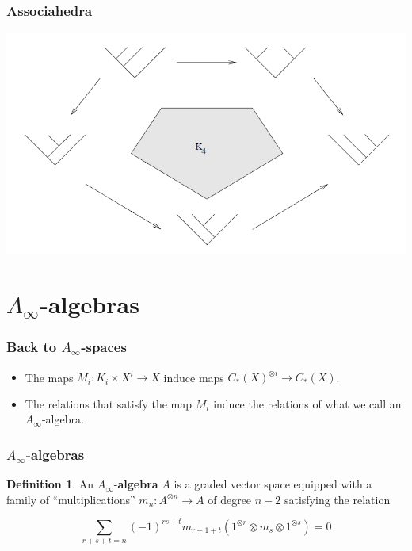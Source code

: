 \documentclass{beamer}
\theoremstyle{definition}
\newtheorem{defi}{Definition}
\begin{document}
\begin{frame}
\frametitle{Associahedra}
\includegraphics[scale=0.5]{Imagenes/assoc}
\end{frame}


\section{$A_\infty$-algebras}
\begin{frame}
\frametitle{Back to $A_\infty$-spaces}
\begin{itemize}
\item<1-> The maps $M_i:K_i\times X^i\to X$ induce maps $C_*(X)^{\otimes i}\to C_*(X)$. %

\item<2-> The relations that satisfy the map $M_i$ induce the relations of what we call an $A_\infty$-algebra.
\end{itemize}
\end{frame}
\begin{frame}
\frametitle{$A_\infty$-algebras}
\begin{defi}
An $A_\infty$-\textbf{algebra} $A$ is a graded vector space equipped with a family of ``multiplications'' $m_n:A^{\otimes n}\to A$ of degree $n-2$ satisfying the relation %

\[\sum_{r+s+t=n}(-1)^{rs+t}m_{r+1+t}(1^{\otimes r}\otimes m_s\otimes 1^{\otimes s})=0\] %
\end{defi}
\end{frame}
\end{document}
